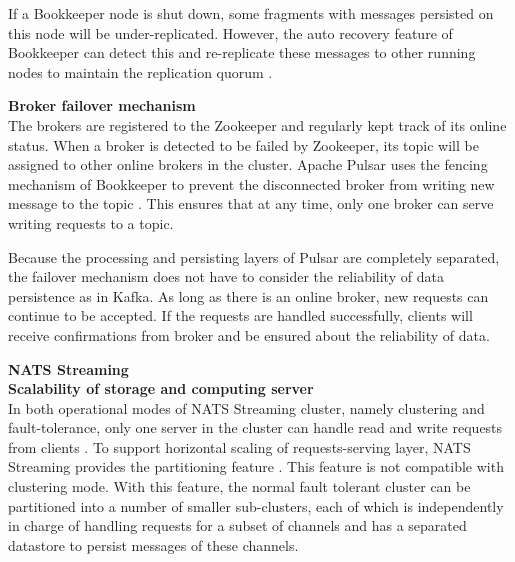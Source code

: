 If a Bookkeeper node is shut down, some fragments with messages persisted on this node will be under-replicated. However, the auto recovery feature of Bookkeeper can detect this and re-replicate these messages to other running nodes to maintain the replication quorum \cite{bookkeeperautoreco}.

\textbf{Broker failover mechanism}\\
The brokers are registered to the Zookeeper and regularly kept track of its online status. When a broker is detected to be failed by Zookeeper, its topic will be assigned to other online brokers in the cluster. Apache Pulsar uses the fencing mechanism of Bookkeeper to prevent the disconnected broker from writing new message to the topic \cite{pulsarbinaryprotocol}. This ensures that at any time, only one broker can serve writing requests to a topic.

Because the processing and persisting layers of Pulsar are completely separated, the failover mechanism does not have to consider the reliability of data persistence as in Kafka. As long as there is an online broker, new requests can continue to be accepted. If the requests are handled successfully, clients will receive confirmations from broker and be ensured about the reliability of data. 

\large \textbf{NATS Streaming}\\
\normalsize
\textbf{Scalability of storage and computing server}\\
In both operational modes of NATS Streaming cluster, namely clustering and fault-tolerance, only one server in the cluster can handle read and write requests from clients \cite{natsstreaming}. To support horizontal scaling of requests-serving layer, NATS Streaming provides the partitioning feature \cite{natspartitioning}. This feature is not compatible with clustering mode. With this feature, the normal fault tolerant cluster can be partitioned into a number of smaller sub-clusters, each of which is independently in charge of handling requests for a subset of channels and has a separated datastore to persist messages of these channels. 

